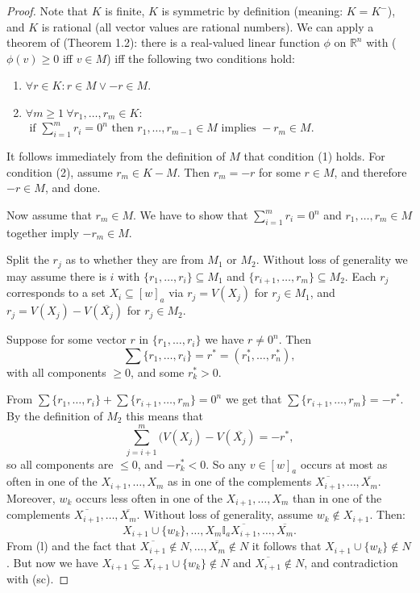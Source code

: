 \documentclass[12pt]{article}
\theoremstyle{definition}
\newcommand{\Ree}{\mathbb{R}}  %
\begin{document}
\begin{proof}
  Note that $K$ is finite, $K$ is symmetric by definition (meaning:
  $K = K^-$), and $K$ is rational (all vector values are rational numbers). 
  We can apply a theorem of \cite{Sco64:JMP} (Theorem 1.2): there is a real-valued
  linear function $\phi$ on $\Ree^n$ with ($\phi(v) \geq 0$ iff $v \in M$) iff 
  the following two conditions hold: 
  \begin{enumerate} 
  \item $\forall r \in K: r \in M \lor -r \in M$. 
  \item $\forall m \geq 1 \ \forall r_1, \ldots, r_m \in K:$ \\
   $\text{ if } \sum_{i=1}^m r_i = 0^n \text{ then } 
     r_1, \ldots, r_{m-1} \in M \text{ implies } -r_m \in M$. 
  \end{enumerate}
  It follows immediately from the definition of $M$ that condition (1) holds. 
  For condition (2), assume $r_m \in K-M$. Then $r_m = -r$ for some $r \in M$, 
  and therefore $-r \in M$, and done. 
  
  Now assume that $r_m \in M$. We have to show that $\sum_{i=1}^m r_i =
  0^n$ and $r_1, \ldots, r_{m} \in M$ together imply $-r_m \in M$.
  
  Split the $r_j$ as to whether they are from $M_1$ or $M_2$. Without loss of 
  generality we may assume there is $i$ with $\{ r_1, \ldots, r_i \} \subseteq M_1$ 
  and $\{ r_{i+1}, \ldots, r_m \} \subseteq M_2$. Each $r_j$ corresponds to a set 
  $X_i \subseteq [w]_a$ via $r_j = V(X_j)$ for $r_j \in M_1$, and $r_j = V(X_j) - 
  V(\overline{X_j})$ for $r_j \in M_2$. 
  
  Suppose for some vector $r$ in $\{ r_1, \ldots, r_i \}$ we have $r \neq 0^n$. Then 
  \[
    \sum \{ r_1, \ldots, r_i \} = r^* = (r^*_1, \ldots, r^*_n),
  \]
  with all components $\geq 0$, and some $r^*_k > 0$. 
  
  From $\sum \{ r_1, \ldots, r_i \} + \sum \{ r_{i+1}, \ldots, r_m \}   = 0^n$ we get 
  that $\sum \{ r_{i+1}, \ldots, r_m \} = -r^*$. 
  By the definition of $M_2$ this means that  
  \[
    \sum_{j= i+1}^m (V(X_j) - V(\overline{X_j}) = -r^*, 
  \]
  so all components are $\leq 0$, and $-r^*_k < 0$.  So any $v \in
  [w]_a$ occurs at most as often in one of the $X_{i+1}, \ldots, X_m$ as
  in one of the complements $\overline{X_{i+1}},\ldots, \overline{X_m}$.
  Moreover, $w_k$ occurs less often in one of the $X_{i+1}, \ldots, X_m$
  than in one of the complements $\overline{X_{i+1}},\ldots,
  \overline{X_m}$. Without loss of generality, assume $w_k \notin
  X_{i+1}$. Then:
  \[
   X_{i+1} \cup \{ w_k \}, \ldots, X_m \mathbb{I}_a \overline{X_{i+1}},\ldots, \overline{X_m}.
  \]
  From (l) and the fact that $\overline{X_{i+1}} \notin N,\ldots,
  \overline{X_m} \notin N$ it follows that $X_{i+1} \cup \{ w_k \}
  \notin N$. But now we have $X_{i+1} \subsetneq X_{i+1} \cup \{ w_k \} \notin N$
  and $\overline{X_{i+1}} \notin N$, and contradiction with (sc).
  

\end{proof}
\end{document}
